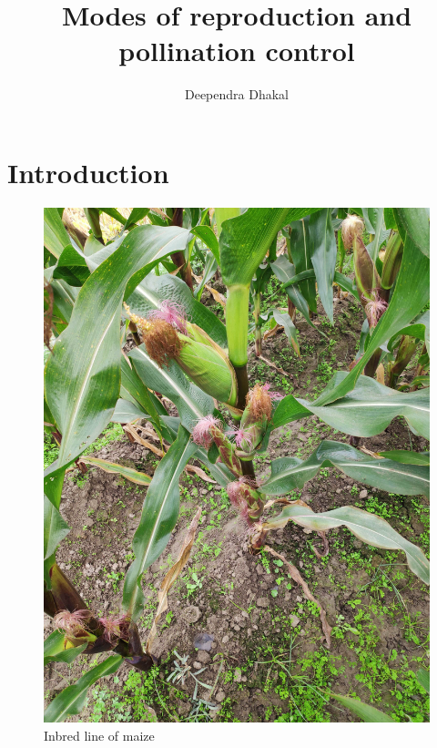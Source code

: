 \documentclass[11pt,ignorenonframetext,aspectratio=169]{beamer}
\title[]{Modes of reproduction and pollination control}
\author[
        Deependra Dhakal
    ]{Deependra Dhakal}
\institute[
    ]{
    Agriculture and Forestry University\\
\textit{ddhakal.rookie@gmail.com}\\
\url{https://rookie.rbind.io}
    }
\date[
      
  ]{
    }
\begin{document}
  \begin{frame}[plain]
  \titlepage
  \end{frame}



\hypertarget{introduction}{%
\section{Introduction}\label{introduction}}

\begin{frame}{}
\protect\hypertarget{section}{}
\begin{figure}

{\centering \includegraphics[width=0.5\linewidth]{./images/Maize_inbred} 

}

\caption{Inbred line of maize}\label{fig:maize}
\end{figure}
\end{frame}
\end{document}
